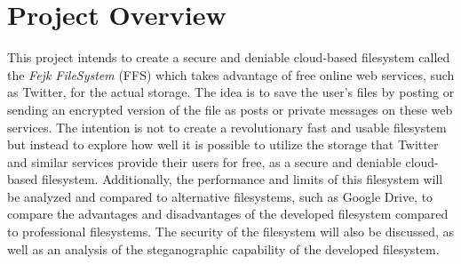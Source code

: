 \section{Project Overview}

This project intends to create a secure and deniable cloud-based filesystem called the \textit{Fejk FileSystem} (FFS) which takes advantage of free online web services, such as Twitter, for the actual storage. The idea is to save the user's files by posting or sending an encrypted version of the file as posts or private messages on these web services. The intention is not to create a revolutionary fast and usable filesystem but instead to explore how well it is possible to utilize the storage that Twitter and similar services provide their users for free, as a secure and deniable cloud-based filesystem. Additionally, the performance and limits of this filesystem will be analyzed and compared to alternative filesystems, such as Google Drive, to compare the advantages and disadvantages of the developed filesystem compared to professional filesystems. The security of the filesystem will also be discussed, as well as an analysis of the steganographic capability of the developed filesystem.